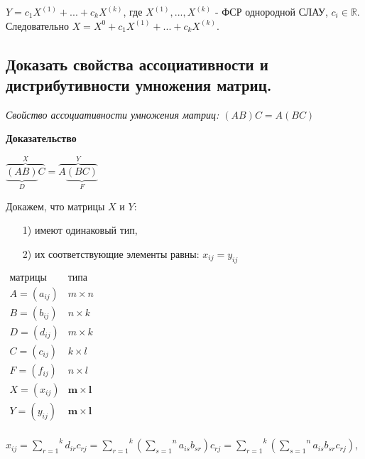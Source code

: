 $Y = c_1X^{(1)} + ... +  c_kX^{(k)}$, где $X^{(1)}, ..., X^{(k)}$ - ФСР однородной СЛАУ, $c_i \in \mathbb{R}$. Следовательно $X = X^0 + c_1X^{(1)} + ... + c_kX^{(k)}$.  

\ep

\subsection{Доказать свойства ассоциативности и дистрибутивности умножения матриц. }

\textit {Свойство ассоциативности умножения матриц: $(AB)C = A(BC)$}

\vspace*{15pt}

{\bf {Доказательство}}

\vspace*{15pt}

$\overbrace{\underbrace{(AB)}_{D}C}^{X} = \overbrace{A\underbrace{(BC)}_{F}}^{Y}$


Докажем, что матрицы $X$ и $Y$:
\begin{enumerate}
    \item[1)] имеют одинаковый тип,
    \item[2)] их соответствующие элементы равны: $x_{ij} = y_{ij}$ 
\end{enumerate}

    $
    \begin{array}{ c|c } 
     \text {матрицы} & \text{типа} \\
     \hline
     A = (a_{ij}) & m \times n \\ 
     B = (b_{ij}) & n \times k \\ 
     D = (d_{ij}) & m \times k \\  
     C = (c_{ij}) & k \times l \\ 
     F = (f_{ij}) & n \times l \\ 
     X = (x_{ij}) & \mathbf{m \times l} \\ 
     Y = (y_{ij}) & \mathbf{m \times l} \\ 
    \end{array}
    $

    \vspace*{15pt}
    $x_{ij} =\overset{k}{\underset{r = 1}{\sum}}d_{ir}c_{rj} = \overset{k}{\underset{r = 1}{\sum}}(\overset{n}{\underset{s = 1}{\sum}}a_{is}b_{sr})c_{rj} = \overset{k}{\underset{r = 1}{\sum}}(\overset{n}{\underset{s = 1}{\sum}}a_{is}b_{sr}c_{rj})$,
    
